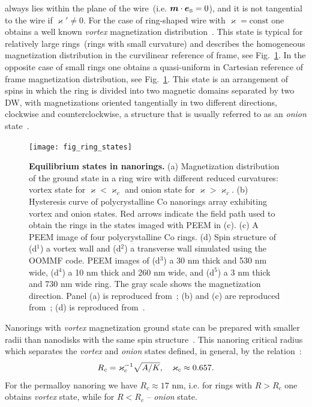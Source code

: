 \documentclass[runningheads]{llncs}
\begin{document}
always lies within the plane of the wire~(i.e. $\vec{m}\cdot\vec{e}_\textsc{b}=0$), and it is not tangential to the wire if $\varkappa'\neq0$. For the case of ring-shaped wire with $\varkappa=\text{const}$ one obtains a well known \textit{vortex} magnetization distribution~\cite{Klaui03a,Sheka15,Guimaraes17}. This state is typical for relatively large rings~(rings with small curvature) and describes the homogeneous magnetization distribution in the curvilinear reference of frame, see Fig.~\ref{fig:ring_states}. In the opposite case of small rings one obtains a quasi-uniform in Cartesian reference of frame magnetization distribution, see Fig.~\ref{fig:ring_states}. This state is an arrangement of spins in which the ring is divided into two magnetic domains separated by two DW, with magnetizations oriented tangentially in two different directions, clockwise and counterclockwise, a structure that is usually referred to as an \textit{onion} state~\cite{Klaui03a}.

\begin{figure}[t]
	\texttt{[image: fig\_ring\_states]}
	\caption{\label{fig:ring_states}%
		\textbf{Equilibrium states in nanorings.} (a) Magnetization distribution of the ground state in a ring wire with different reduced curvatures: vortex state for $\varkappa<\varkappa_c$ and onion state for $\varkappa>\varkappa_c$. (b) Hysteresis curve of polycrystalline  Co nanorings array exhibiting vortex and onion states. Red arrows indicate the field path used to obtain the rings in the states imaged with PEEM in (c). (c) A PEEM image of	four polycrystalline Co rings. (d) Spin structure of (d$^1$) a vortex wall and (d$^2$) a transverse wall simulated using the OOMMF code. PEEM images of (d$^3$) a 30 nm thick and 530 nm wide, (d$^4$) a 10 nm thick and 260 nm wide, and	(d$^5$) a 3 nm thick and 730 nm wide ring. The gray scale shows	the magnetization direction. Panel (a) is reproduced from~\cite{Sheka15}; (b) and (c) are reproduced from~\cite{Klaui03a}; (d) is reproduced from~\cite{Laufenberg06}.}
\end{figure}

Nanorings with \textit{vortex} magnetization ground state can be prepared with smaller radii than nanodisks with the same spin structure~\cite{Kravchuk07}. This nanoring critical radius which separates the \textit{vortex} and \textit{onion} states defined, in general, by the relation~\cite{Sheka15}:
\begin{equation}\notag
R_{c} = \varkappa_c^{-1}\sqrt{A/K},\quad \varkappa_c \approx 0.657.
\end{equation}
For the permalloy nanoring we have $R_{c}\approx 17$ nm, i.e. for rings with $R>R_c$ one obtains \textit{vortex} state, while for $R<R_c$ -- \textit{onion} state.
\end{document}
